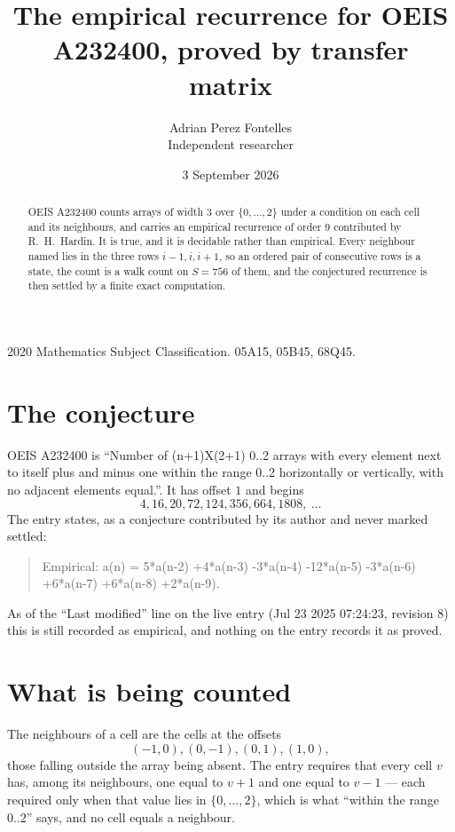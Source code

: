 \documentclass[11pt,a4paper]{article}
\title{The empirical recurrence for OEIS A232400, proved by transfer matrix}
\author{Adrian Perez Fontelles\\ \small Independent researcher}
\date{3 September 2026}
\theoremstyle{plain}
\theoremstyle{definition}
\begin{document}
\maketitle

\begin{abstract}
OEIS A232400 counts arrays of width $3$ over $\{0,\dots,2\}$ under a condition on each cell
and its neighbours, and carries an empirical recurrence of order $9$ contributed by
R.~H.~Hardin. It is true, and it is decidable rather than empirical. Every neighbour named lies
in the three rows $i-1,i,i+1$, so an ordered pair of consecutive rows is a state, the count is
a walk count on $S=756$ of them, and the conjectured recurrence is then settled by a finite
exact computation.
\end{abstract}

\noindent\small 2020 Mathematics Subject Classification. 05A15, 05B45, 68Q45.\normalsize

\section{The conjecture}

OEIS A232400 is ``Number of (n+1)X(2+1) 0..2 arrays with every element next to itself plus and minus one within the range 0..2 horizontally or vertically, with no adjacent elements equal.''. It has offset $1$ and begins
\[
4, 16, 20, 72, 124, 356, 664, 1808,\ \dots
\]
The entry states, as a conjecture contributed by its author and never marked settled:
\begin{quote}
Empirical: a(n) = 5*a(n-2) +4*a(n-3) -3*a(n-4) -12*a(n-5) -3*a(n-6) +6*a(n-7) +6*a(n-8) +2*a(n-9).
\end{quote}
As of the ``Last modified'' line on the live entry (Jul 23 2025 07:24:23, revision 8) this is still
recorded as empirical, and nothing on the entry records it as proved.

\section{What is being counted}

The neighbours of a cell are the cells at the offsets
\[
(-1,0), (0,-1), (0,1), (1,0),
\]
those falling outside the array being absent. The entry requires that every cell $v$ has, among its neighbours, one equal to $v+1$ and one equal to $v-1$ --- each required only when that value lies in $\{0,\dots,2\}$, which is what ``within the range $0..2$'' says, and no cell equals a neighbour.
\end{document}
